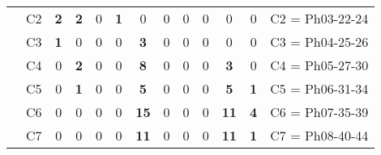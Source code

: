 \begin{table}[H]
{\begin{tabular}{|ccrrrrrrrrrrc|}
\multicolumn{1}{|c|}{}                                      & \multicolumn{1}{c|}{C2} & \multicolumn{1}{c|}{\textbf{2}} & \multicolumn{1}{c|}{\textbf{2}} & \multicolumn{1}{c|}{0}  & \multicolumn{1}{c|}{\textbf{1}}  & \multicolumn{1}{c|}{0}           & \multicolumn{1}{c|}{0}  & \multicolumn{1}{c|}{0}  & \multicolumn{1}{c|}{0}  & \multicolumn{1}{c|}{0}           & \multicolumn{1}{c|}{0}           & C2 = Ph03-22-24   \\ \cline{2-13}
\multicolumn{1}{|c|}{}                                      & \multicolumn{1}{c|}{C3} & \multicolumn{1}{c|}{\textbf{1}} & \multicolumn{1}{c|}{0}          & \multicolumn{1}{c|}{0}  & \multicolumn{1}{c|}{0}  & \multicolumn{1}{c|}{\textbf{3}}  & \multicolumn{1}{c|}{0}  & \multicolumn{1}{c|}{0}  & \multicolumn{1}{c|}{0}  & \multicolumn{1}{c|}{0}           & \multicolumn{1}{c|}{0}           & C3 = Ph04-25-26   \\ \cline{2-13}
\multicolumn{1}{|c|}{}                                      & \multicolumn{1}{c|}{C4} & \multicolumn{1}{c|}{0}          & \multicolumn{1}{c|}{\textbf{2}} & \multicolumn{1}{c|}{0}  & \multicolumn{1}{c|}{0}  & \multicolumn{1}{c|}{\textbf{8}}  & \multicolumn{1}{c|}{0}  & \multicolumn{1}{c|}{0}  & \multicolumn{1}{c|}{0}  & \multicolumn{1}{c|}{\textbf{3}}  & \multicolumn{1}{c|}{0}  & C4 = Ph05-27-30   \\ \cline{2-13}
\multicolumn{1}{|c|}{}                                      & \multicolumn{1}{c|}{C5} & \multicolumn{1}{c|}{0}          & \multicolumn{1}{c|}{\textbf{1}} & \multicolumn{1}{c|}{0}  & \multicolumn{1}{c|}{0}  & \multicolumn{1}{c|}{\textbf{5}}  & \multicolumn{1}{c|}{0}  & \multicolumn{1}{c|}{0}  & \multicolumn{1}{c|}{0}  & \multicolumn{1}{c|}{\textbf{5}}  & \multicolumn{1}{c|}{\textbf{1}}  & C5 = Ph06-31-34   \\ \cline{2-13}
\multicolumn{1}{|c|}{}                                      & \multicolumn{1}{c|}{C6} & \multicolumn{1}{c|}{0}          & \multicolumn{1}{c|}{0}          & \multicolumn{1}{c|}{0}  & \multicolumn{1}{c|}{0}  & \multicolumn{1}{c|}{\textbf{15}} & \multicolumn{1}{c|}{0}  & \multicolumn{1}{c|}{0}  & \multicolumn{1}{c|}{0}  & \multicolumn{1}{c|}{\textbf{11}} & \multicolumn{1}{c|}{\textbf{4}}  & C6 = Ph07-35-39   \\ \cline{2-13}
\multicolumn{1}{|c|}{}                                      & \multicolumn{1}{c|}{C7} & \multicolumn{1}{c|}{0}          & \multicolumn{1}{c|}{0}          & \multicolumn{1}{c|}{0}  & \multicolumn{1}{c|}{0}  & \multicolumn{1}{c|}{\textbf{11}} & \multicolumn{1}{c|}{0}  & \multicolumn{1}{c|}{0}  & \multicolumn{1}{c|}{0}  & \multicolumn{1}{c|}{\textbf{11}} & \multicolumn{1}{c|}{\textbf{1}}  & C7 = Ph08-40-44   \\ \cline{2-13}

\end{tabular}}
\end{table}
